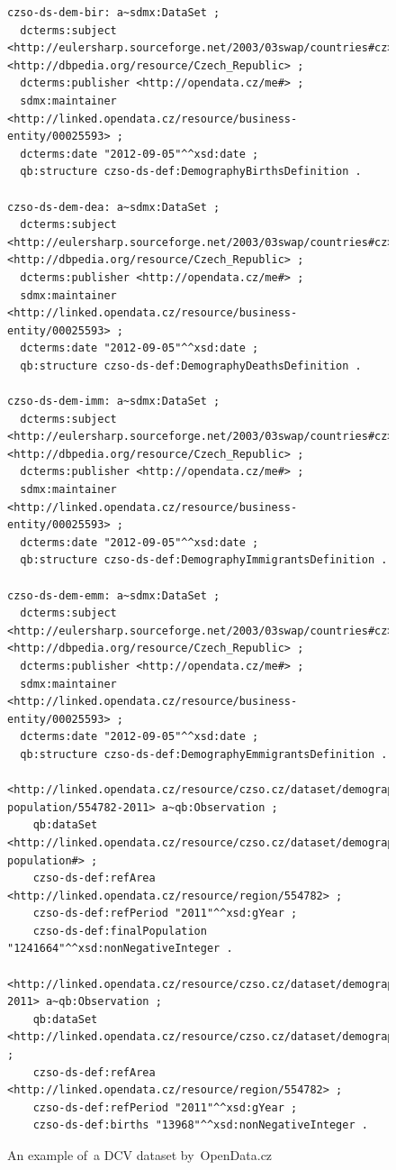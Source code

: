 \begin{figure}
\begin{verbatim}
czso-ds-dem-bir: a~sdmx:DataSet ;
  dcterms:subject <http://eulersharp.sourceforge.net/2003/03swap/countries#cz>, <http://dbpedia.org/resource/Czech_Republic> ;
  dcterms:publisher <http://opendata.cz/me#> ;
  sdmx:maintainer <http://linked.opendata.cz/resource/business-entity/00025593> ;
  dcterms:date "2012-09-05"^^xsd:date ;
  qb:structure czso-ds-def:DemographyBirthsDefinition .
  
czso-ds-dem-dea: a~sdmx:DataSet ;
  dcterms:subject <http://eulersharp.sourceforge.net/2003/03swap/countries#cz>, <http://dbpedia.org/resource/Czech_Republic> ;
  dcterms:publisher <http://opendata.cz/me#> ;
  sdmx:maintainer <http://linked.opendata.cz/resource/business-entity/00025593> ;
  dcterms:date "2012-09-05"^^xsd:date ;
  qb:structure czso-ds-def:DemographyDeathsDefinition .
  
czso-ds-dem-imm: a~sdmx:DataSet ;
  dcterms:subject <http://eulersharp.sourceforge.net/2003/03swap/countries#cz>, <http://dbpedia.org/resource/Czech_Republic> ;
  dcterms:publisher <http://opendata.cz/me#> ;
  sdmx:maintainer <http://linked.opendata.cz/resource/business-entity/00025593> ;
  dcterms:date "2012-09-05"^^xsd:date ;
  qb:structure czso-ds-def:DemographyImmigrantsDefinition .
  
czso-ds-dem-emm: a~sdmx:DataSet ;
  dcterms:subject <http://eulersharp.sourceforge.net/2003/03swap/countries#cz>, <http://dbpedia.org/resource/Czech_Republic> ;
  dcterms:publisher <http://opendata.cz/me#> ;
  sdmx:maintainer <http://linked.opendata.cz/resource/business-entity/00025593> ;
  dcterms:date "2012-09-05"^^xsd:date ;
  qb:structure czso-ds-def:DemographyEmmigrantsDefinition .
  
<http://linked.opendata.cz/resource/czso.cz/dataset/demography/final-population/554782-2011> a~qb:Observation ;
    qb:dataSet <http://linked.opendata.cz/resource/czso.cz/dataset/demography/final-population#> ;
    czso-ds-def:refArea <http://linked.opendata.cz/resource/region/554782> ;
    czso-ds-def:refPeriod "2011"^^xsd:gYear ;
    czso-ds-def:finalPopulation "1241664"^^xsd:nonNegativeInteger .

<http://linked.opendata.cz/resource/czso.cz/dataset/demography/births/554782-2011> a~qb:Observation ;
    qb:dataSet <http://linked.opendata.cz/resource/czso.cz/dataset/demography/births#> ;
    czso-ds-def:refArea <http://linked.opendata.cz/resource/region/554782> ;
    czso-ds-def:refPeriod "2011"^^xsd:gYear ;
    czso-ds-def:births "13968"^^xsd:nonNegativeInteger .
\end{verbatim}\normalsize
\caption{An example of~a DCV dataset by~OpenData.cz}
\label{fig:example-dcv-dataset}
\end{figure}

